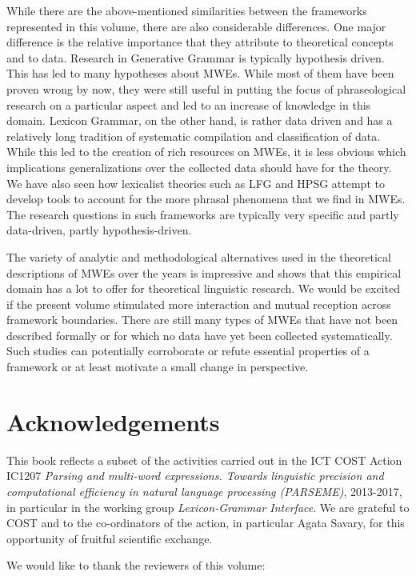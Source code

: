 \documentclass[output=paper]{langsci/langscibook}
\begin{document}
While there are the above-mentioned similarities between the frameworks represented in this volume, there are also considerable differences. One major difference is the relative importance that they attribute to theoretical concepts and to data. Research in Generative Grammar is typically hypothesis driven. This has led to many hypotheses about MWEs. While most of them have been proven wrong by now, they were still useful in putting the focus of phraseological research on a particular aspect and led to an increase of knowledge in this domain.  Lexicon Grammar, on the other hand, is rather data driven and has a relatively long tradition of systematic compilation and classification of data. While this led to the creation of rich resources on MWEs, it is less obvious which implications generalizations over the collected data should have for the theory. We have also seen how lexicalist theories such as LFG and HPSG attempt to develop tools to account for the more phrasal phenomena that we find in MWEs. The research questions in such frameworks are typically very specific and partly data-driven, partly hypothesis-driven.

The variety of analytic and methodological alternatives used in the theoretical descriptions of MWEs over the years is impressive and shows that this empirical domain has a lot to offer for theoretical linguistic research. We would be excited if the present volume stimulated more interaction and mutual reception across framework boundaries. There are still many types of MWEs that have not been described formally or for which no data have yet been collected systematically. Such studies can potentially corroborate or refute essential properties of a framework or at least motivate a small change in perspective.



\section*{Acknowledgements} 
This book reflects a subset of the activities carried out in the ICT COST Action IC1207 \textit{Parsing and multi-word expressions. Towards linguistic precision and computational efficiency in natural language processing (PARSEME)}, 2013-2017, in particular in the working group \emph{Lexicon-Grammar Interface}. We are grateful to COST and to the co-ordinators of the action, in particular Agata Savary, for this opportunity of fruitful scientific exchange. 

We would like to thank the reviewers of this volume:
\end{document}
